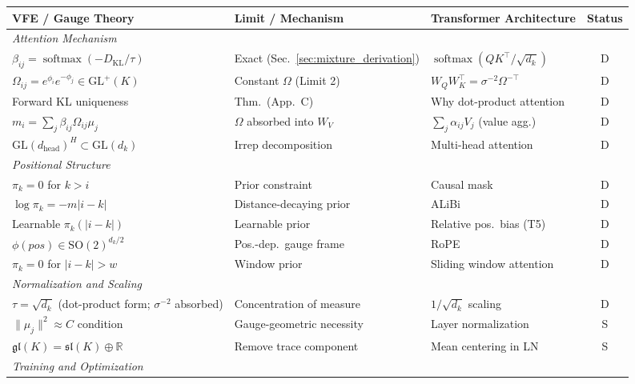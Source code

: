 \documentclass[twoside,11pt]{article}
\newcommand{\softmax}{\operatorname{softmax}}
\newcommand{\KL}{\operatorname{KL}}
\begin{document}
\begin{table}[p]
\centering
\renewcommand{\arraystretch}{1.15}
\setlength{\tabcolsep}{4pt}
\small
\begin{tabular}{|l|l|l|c|}
\hline
\textbf{VFE / Gauge Theory} & \textbf{Limit / Mechanism} & \textbf{Transformer Architecture} & \textbf{Status} \\
\hline
\multicolumn{4}{|l|}{\textit{Attention Mechanism}} \\
\hline
$\beta_{ij} \!=\! \softmax(-D_{\KL}/\tau)$ & Exact (Sec.~\ref{sec:mixture_derivation}) & $\softmax(QK^\top\!/\!\sqrt{d_k})$ & D \\
$\Omega_{ij}\!=\!e^{\phi_i}e^{-\phi_j}\!\in\!\mathrm{GL}^+(K)$ & Constant $\Omega$ (Limit 2) & $W_Q W_K^\top\!=\!\sigma^{-2}\Omega^{-\top}$ & D \\
Forward KL uniqueness & Thm.\ (App.~C) & Why dot-product attention & D \\
$m_i \!=\! \sum_j \beta_{ij}\Omega_{ij}\mu_j$ & $\Omega$ absorbed into $W_V$ & $\sum_j \alpha_{ij} V_j$ (value agg.) & D \\
$\mathrm{GL}(d_{\text{head}})^H \!\subset\! \mathrm{GL}(d_k)$ & Irrep decomposition & Multi-head attention & D \\
\hline
\multicolumn{4}{|l|}{\textit{Positional Structure}} \\
\hline
$\pi_k = 0$ for $k > i$ & Prior constraint & Causal mask & D \\
$\log\pi_k = -m|i\!-\!k|$ & Distance-decaying prior & ALiBi & D \\
Learnable $\pi_k(|i\!-\!k|)$ & Learnable prior & Relative pos.\ bias (T5) & D \\
$\phi(pos) \!\in\! \mathrm{SO}(2)^{d_k/2}$ & Pos.-dep.\ gauge frame & RoPE & D \\
$\pi_k = 0$ for $|i\!-\!k|>w$ & Window prior & Sliding window attention & D \\
\hline
\multicolumn{4}{|l|}{\textit{Normalization and Scaling}} \\
\hline
$\tau = \sqrt{d_k}$ (dot-product form; $\sigma^{-2}$ absorbed) & Concentration of measure & $1/\sqrt{d_k}$ scaling & D \\
$\|\mu_j\|^2 \approx C$ condition & Gauge-geometric necessity & Layer normalization & S \\
$\mathfrak{gl}(K) \!=\! \mathfrak{sl}(K) \oplus \mathbb{R}$ & Remove trace component & Mean centering in LN & S \\
\hline
\multicolumn{4}{|l|}{\textit{Training and Optimization}} \\

\end{tabular}
\end{table}
\end{document}
